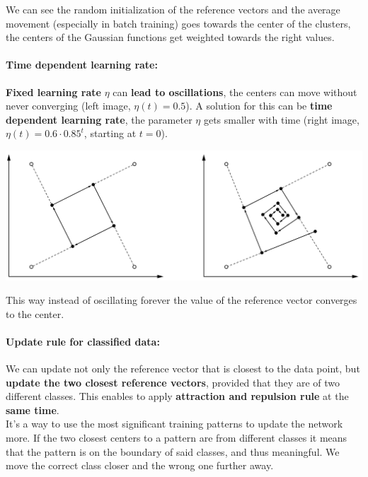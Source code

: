 We can see the random initialization of the reference vectors and the average movement (especially in batch training) goes towards the center of the clusters, the centers of the Gaussian functions get weighted towards the right values.\\

\paragraph{Time dependent learning rate:} \textbf{Fixed learning rate} $\eta$ can \textbf{lead to oscillations}, the centers can move without never converging (left image, $\eta(t) = 0.5$). A solution for this can be \textbf{time dependent learning rate}, the parameter $\eta$ gets smaller with time (right image, $\eta(t) = 0.6 \cdot 0.85^t$, starting at $t=0$).
\begin{center}
	\includegraphics[width=0.9\columnwidth]{img/NN/LVQ3}
\end{center}
This way instead of oscillating forever the value of the reference vector converges to the center.\\

\newpage

\paragraph{Update rule for classified data:} We can update not only the reference vector that is closest to the data point, but \textbf{update the two closest reference vectors}, provided that they are of two different classes. This enables to apply \textbf{attraction and repulsion rule} at the \textbf{same time}.\\

It's a way to use the most significant training patterns to update the network more. If the two closest centers to a pattern are from different classes it means that the pattern is on the boundary of said classes, and thus meaningful. We move the correct class closer and the wrong one further away.\\

